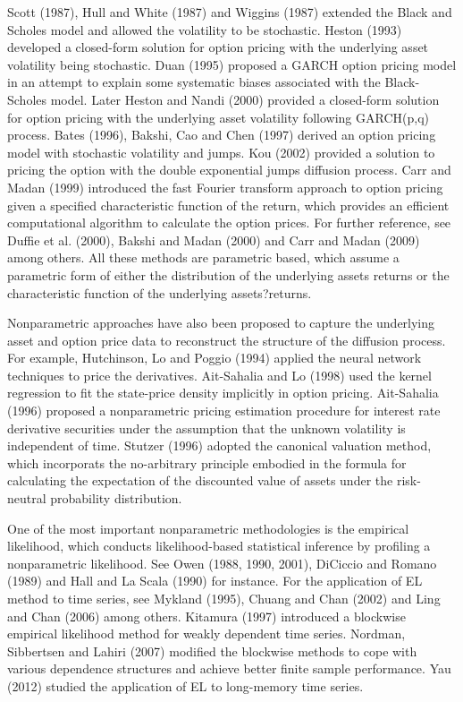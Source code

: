 \documentclass[oneside,english]{amsbook}
\numberwithin{section}{chapter}
\numberwithin{equation}{section}
\numberwithin{figure}{section}
\theoremstyle{plain}
\theoremstyle{plain}
\theoremstyle{definition}
\theoremstyle{plain}
\theoremstyle{plain}
\theoremstyle{remark}
\theoremstyle{definition}
\theoremstyle{definition}
\begin{document}
Scott (1987), Hull and White (1987) and Wiggins (1987) extended the Black and Scholes model and allowed the volatility to be stochastic. Heston (1993) developed a closed-form solution for option pricing with the underlying asset volatility being stochastic. Duan (1995) proposed a GARCH option pricing model in an attempt to explain some systematic biases associated with the Black-Scholes model. Later Heston and Nandi (2000) provided a closed-form solution for option pricing with the underlying asset volatility following GARCH(p,q) process. Bates (1996), Bakshi, Cao and Chen (1997) derived an option pricing model with stochastic volatility and jumps. Kou (2002) provided a solution to pricing the option with the double exponential jumps diffusion process. Carr and Madan (1999) introduced the fast Fourier transform approach to option pricing given a specified characteristic function of the return, which provides an efficient computational algorithm to calculate the option prices. For further reference, see Duffie et al. (2000), Bakshi and Madan (2000) and Carr and Madan (2009) among others. All these methods are parametric based, which assume a parametric form of either the distribution of the underlying assets returns or the characteristic function of the underlying assets?returns. 

Nonparametric approaches have also been proposed to capture the underlying asset and option price data to reconstruct the structure of the diffusion process. For example, Hutchinson, Lo and Poggio (1994) applied the neural network techniques to price the derivatives. Ait-Sahalia and Lo (1998) used the kernel regression to fit the state-price density implicitly in option pricing. Ait-Sahalia (1996) proposed a nonparametric pricing estimation procedure for interest rate derivative securities under the assumption that the unknown volatility is independent of time. Stutzer (1996) adopted the canonical valuation method, which incorporats the no-arbitrary principle embodied in the formula for calculating the expectation of the discounted value of assets under the risk-neutral probability distribution. 

One of the most important nonparametric methodologies is the empirical likelihood, which conducts likelihood-based statistical inference by profiling a nonparametric likelihood. See Owen (1988, 1990, 2001), DiCiccio and Romano (1989) and Hall and La Scala (1990) for instance. For the application of EL method to time series, see Mykland (1995), Chuang and Chan (2002) and Ling and Chan (2006) among others.  Kitamura (1997) introduced a blockwise empirical likelihood method for weakly dependent time series. Nordman, Sibbertsen and Lahiri (2007) modified the blockwise methods to cope with various dependence structures and achieve better finite sample performance. Yau (2012) studied the application of EL to long-memory time series. 
\end{document}
